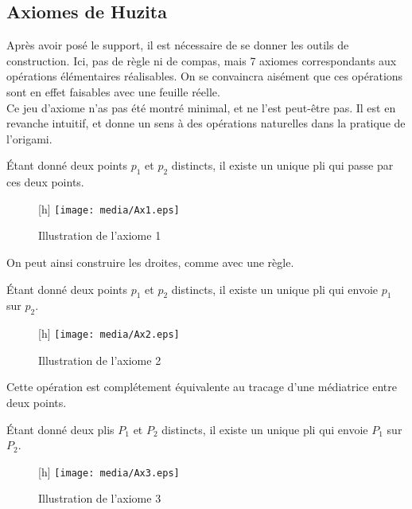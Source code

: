 \documentclass[a4paper,12pt,french,draft]{report}
\begin{document}
	\subsection{Axiomes de Huzita}
		Après avoir posé le support, il est nécessaire de se donner les outils de construction. Ici, pas de règle ni de compas, mais 7 axiomes correspondants aux opérations élémentaires réalisables. On se convaincra aisément que ces opérations sont en effet faisables avec une feuille réelle. \\
		Ce jeu d'axiome n'as pas été montré minimal, et ne l'est peut-être pas. Il est en revanche intuitif, et donne un sens à des opérations naturelles dans la pratique de l'origami. 
		\begin{axiome}[1]
			Étant donné deux points $p_{1}$ et $p_{2}$ distincts, il existe un unique pli qui passe par ces deux points.
		\end{axiome}
		
		\begin{figure}
		    \begin{center}[h]
			\texttt{[image: media/Ax1.eps]}
		    \end{center}
			\caption{Illustration de l'axiome 1}
		\end{figure}
		
		On peut ainsi construire les droites, comme avec une règle.
		\begin{axiome}[2]
			Étant donné deux points $p_{1}$ et $p_{2}$ distincts, il existe un unique pli qui envoie $p_{1}$ sur $p_{2}$.
		\end{axiome}
		
		\begin{figure}
		    \begin{center}[h]
			\texttt{[image: media/Ax2.eps]}
		    \end{center}
			\caption{Illustration de l'axiome 2}
		\end{figure}
		
		Cette opération est complétement équivalente au tracage d'une médiatrice entre deux points.
		\begin{axiome}[3]
			Étant donné deux plis $P_{1}$ et $P_{2}$ distincts, il existe un unique pli qui envoie $P_{1}$ sur $P_{2}$.
		\end{axiome}
		
		\begin{figure}
		    \begin{center}[h]
			\texttt{[image: media/Ax3.eps]}
		    \end{center}
			\caption{Illustration de l'axiome 3}
		\end{figure}
		
\end{document}
